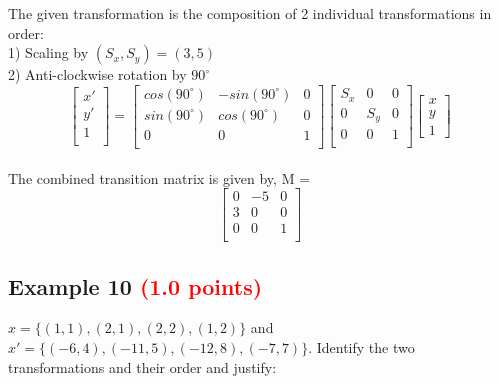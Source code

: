 \documentclass[answers]{exam}
\newcommand{\mypoints}[1]{\textcolor{red}{(#1 points)}}
\begin{document}
\begin{solution}
The given transformation is the composition of 2 individual transformations in order:\\
1) Scaling by $(S_x, S_y) = (3,5)$ \\
2) Anti-clockwise rotation by $90^{\circ}$ \\

$$
\begin{bmatrix} 
x'\\
y'\\
1\\
\end{bmatrix}
=
\begin{bmatrix}
cos(90^{\circ}) & -sin(90^{\circ}) & 0\\
sin(90^{\circ}) & cos(90^{\circ}) & 0\\
0 & 0 & 1\\
\end{bmatrix}
\begin{bmatrix}
S_x & 0 & 0\\
0 & S_y & 0\\
0 & 0 & 1\\
\end{bmatrix}
\begin{bmatrix}
x\\
y\\
1
\end{bmatrix}
$$\\
The combined transition matrix is given by, M =\\
$$
\begin{bmatrix}
0 & -5 & 0\\
3 & 0 & 0\\
0 & 0 & 1\\
\end{bmatrix}$$
\end{solution}

\subsection{Example 10 \mypoints{1.0}}
$x = \{(1,1), (2,1), (2,2), (1,2)\}$ and $x' = \{(-6,4), (-11,5), (-12,8), (-7,7)\}$. Identify the two transformations and their order and justify:
\end{document}
